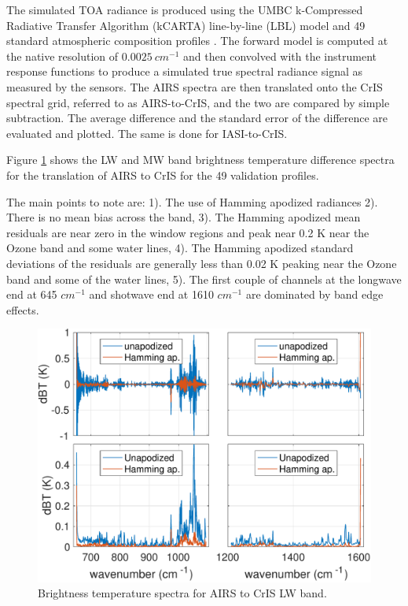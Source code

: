 \documentclass[twocolumn,10pt]{article}
\begin{document}
The simulated TOA radiance is produced using the UMBC k-Compressed Radiative Transfer Algorithm (kCARTA) line-by-line (LBL) model \cite{kcarta1998} and 49 standard atmospheric composition profiles \cite{TIGR1998}. The forward model is computed at the native resolution of $0.0025\ cm^{-1}$ and then convolved with the instrument response functions to produce a simulated true spectral radiance signal as measured by the sensors. The AIRS spectra are then translated onto the CrIS spectral grid, referred to as AIRS-to-CrIS, and the two are compared by simple subtraction. The average difference and the standard error of the difference are evaluated and plotted. The same is done for IASI-to-CrIS. 

Figure \ref{fig:1a} shows the LW and MW band brightness temperature difference spectra for the translation of AIRS to CrIS for the 49 validation profiles.

The main points to note are: 1). The use of Hamming apodized radiances 2). There is no mean bias across the band, 3). The Hamming apodized mean residuals are near zero in the window regions and peak near 0.2 K near the Ozone band and some water lines, 4). The Hamming apodized standard deviations of the residuals are generally less than 0.02 K peaking near the Ozone band and some of the water lines, 5). The first couple of channels at the longwave end at 645 $cm^{-1}$ and shotwave end at 1610 $cm^{-1}$ are dominated by band edge effects.

\begin{figure}[htb]
\centering
\includegraphics[width=\linewidth]{./figs/lls_airs2cris_validation_lw_mw.pdf}
\caption{
  Brightness temperature spectra for AIRS to CrIS LW band.}
\label{fig:1a}
\end{figure}
\end{document}
